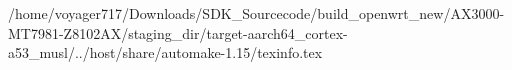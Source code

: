 /home/voyager717/Downloads/SDK_Sourcecode/build_openwrt_new/AX3000-MT7981-Z8102AX/staging_dir/target-aarch64_cortex-a53_musl/../host/share/automake-1.15/texinfo.tex